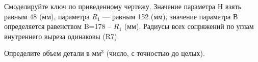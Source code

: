 
Смоделируйте ключ по приведенному чертежу. Значение параметра H взять равным 48 (мм), параметра $R_1$ — равным 152 (мм), 
значение параметра В определяется равенством B=178 – $R_1$ (мм).   Радиусы всех сопряжений по углам внутреннего выреза одинаковы (R7).


Определите объем детали в мм$^3$  (число, с точностью до целых).